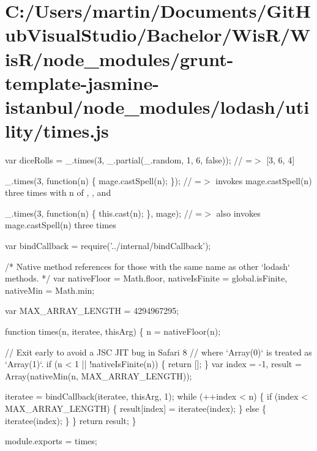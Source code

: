 \hypertarget{_c_1_2_users_2martin_2_documents_2_git_hub_visual_studio_2_bachelor_2_wis_r_2_wis_r_2node_module2614c0e1e1de510d2ffcd116d6581331}{}\section{C\+:/\+Users/martin/\+Documents/\+Git\+Hub\+Visual\+Studio/\+Bachelor/\+Wis\+R/\+Wis\+R/node\+\_\+modules/grunt-\/template-\/jasmine-\/istanbul/node\+\_\+modules/lodash/utility/times.\+js}
var dice\+Rolls = \+\_\+.\+times(3, \+\_\+.\+partial(\+\_\+.\+random, 1, 6, false)); // =$>$ \mbox{[}3, 6, 4\mbox{]}

\+\_\+.\+times(3, function(n) \{ mage.\+cast\+Spell(n); \}); // =$>$ invokes {\ttfamily mage.\+cast\+Spell(n)} three times with {\ttfamily n} of {}, {}, and {}

\+\_\+.\+times(3, function(n) \{ this.\+cast(n); \}, mage); // =$>$ also invokes {\ttfamily mage.\+cast\+Spell(n)} three times


\begin{DoxyCodeInclude}
var bindCallback = require(\textcolor{stringliteral}{'../internal/bindCallback'});

\textcolor{comment}{/* Native method references for those with the same name as other `lodash` methods. */}
var nativeFloor = Math.floor,
    nativeIsFinite = global.isFinite,
    nativeMin = Math.min;

var MAX\_ARRAY\_LENGTH = 4294967295;

\textcolor{keyword}{function} times(n, iteratee, thisArg) \{
  n = nativeFloor(n);

  \textcolor{comment}{// Exit early to avoid a JSC JIT bug in Safari 8}
  \textcolor{comment}{// where `Array(0)` is treated as `Array(1)`.}
  \textcolor{keywordflow}{if} (n < 1 || !nativeIsFinite(n)) \{
    \textcolor{keywordflow}{return} [];
  \}
  var index = -1,
      result = Array(nativeMin(n, MAX\_ARRAY\_LENGTH));

  iteratee = bindCallback(iteratee, thisArg, 1);
  \textcolor{keywordflow}{while} (++index < n) \{
    \textcolor{keywordflow}{if} (index < MAX\_ARRAY\_LENGTH) \{
      result[index] = iteratee(index);
    \} \textcolor{keywordflow}{else} \{
      iteratee(index);
    \}
  \}
  \textcolor{keywordflow}{return} result;
\}

module.exports = times;
\end{DoxyCodeInclude}
 